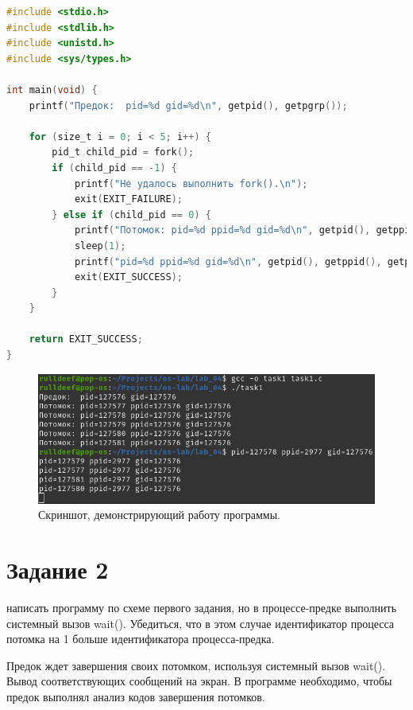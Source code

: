 \begin{lstlisting}[language=C,caption=Исходный код для задания 1]
#include <stdio.h>
#include <stdlib.h>
#include <unistd.h>
#include <sys/types.h>

int main(void) {
	printf("Предок:  pid=%d gid=%d\n", getpid(), getpgrp());
	
	for (size_t i = 0; i < 5; i++) {
		pid_t child_pid = fork();
		if (child_pid == -1) {
			printf("Не удалось выполнить fork().\n");
			exit(EXIT_FAILURE);
		} else if (child_pid == 0) {
			printf("Потомок: pid=%d ppid=%d gid=%d\n", getpid(), getppid(), getpgrp());
			sleep(1);
			printf("pid=%d ppid=%d gid=%d\n", getpid(), getppid(), getpgrp());
			exit(EXIT_SUCCESS);
		}
	}
	
	return EXIT_SUCCESS;
}
\end{lstlisting}

\begin{figure}[ht]
	\centering
	\includegraphics[width=\linewidth]{img/task1.png}
	\caption{Скриншот, демонстрирующий работу программы.}
\end{figure}

\clearpage

\section{Задание 2}

написать программу по схеме первого задания, но в процессе-предке выполнить системный вызов wait(). Убедиться, что в этом случае идентификатор процесса потомка на 1 больше идентификатора процесса-предка.

Предок ждет завершения своих потомком, используя системный вызов wait(). Вывод соответствующих сообщений на экран. В программе необходимо, чтобы предок выполнял анализ кодов завершения потомков.


